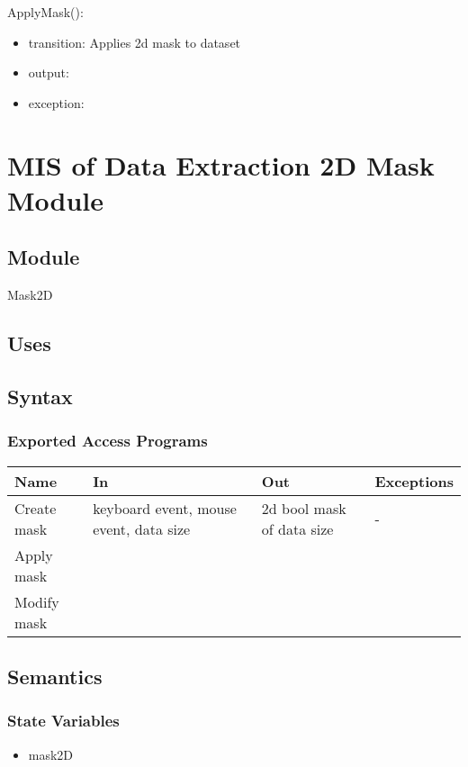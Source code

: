 \documentclass[12pt, titlepage]{article}
\begin{document}
\noindent ApplyMask():
\begin{itemize}
\item transition: Applies 2d mask to dataset
\item output:  
\item exception:  
\end{itemize}

\section{MIS of Data Extraction 2D Mask Module} \label{Mod:Mask2D} 

\subsection{Module}

Mask2D

\subsection{Uses}


\subsection{Syntax}

\subsubsection{Exported Access Programs}

\begin{center}
\begin{tabular}{p{2cm} p{4cm} p{4cm} p{2cm}}
\hline
\textbf{Name} & \textbf{In} & \textbf{Out} & \textbf{Exceptions} \\
\hline
Create mask & keyboard event, mouse event, data size & 2d bool mask of data size & - \\
Apply mask & & & \\
Modify mask & & & \\

\hline
\end{tabular}
\end{center}

\subsection{Semantics}

\subsubsection{State Variables}
\begin{itemize}
\item mask2D
\end{itemize}
\end{document}
